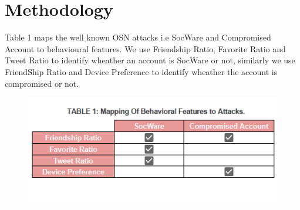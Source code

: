 \documentclass[conference]{IEEEtran}
\begin{document}
		
		


\section{Methodology}
Table 1 maps the well known OSN attacks i.e SocWare and Compromised Account to behavioural features\cite{11}. 
We use Friendship Ratio, Favorite Ratio and Tweet Ratio to identify wheather an account is SocWare or not, similarly we use FriendShip Ratio and
Device Preference to identify wheather the account is compromised or not.

\begin{figure}[h!]
	\includegraphics[scale=0.7]{attack_types2}
\end{figure}
\end{document}
